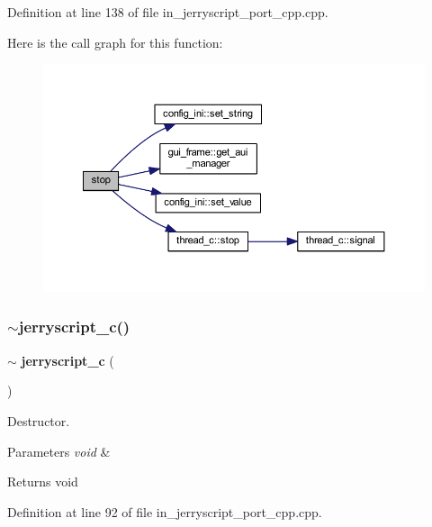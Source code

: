 Definition at line 138 of file in\+\_\+jerryscript\+\_\+port\+\_\+cpp.\+cpp.

Here is the call graph for this function\+:\nopagebreak
\begin{figure}[H]
\begin{center}
\leavevmode
\includegraphics[width=350pt]{group___port_gaacf6bf8e121fea8b0a92d7197b73fe27_cgraph}
\end{center}
\end{figure}
\mbox{\label{group___port_gada28d8430f0b476ab1f392245b2b5fc4}} 
\subsubsection{$\sim$jerryscript\_c()}
{\footnotesize\ttfamily $\sim$\textbf{ jerryscript\+\_\+c} (\begin{DoxyParamCaption}\item[{void}]{ }\end{DoxyParamCaption})}



Destructor. 


\begin{DoxyParams}{Parameters}
{\em void} & \\
\hline
\end{DoxyParams}
\begin{DoxyReturn}{Returns}
void 
\end{DoxyReturn}


Definition at line 92 of file in\+\_\+jerryscript\+\_\+port\+\_\+cpp.\+cpp.

